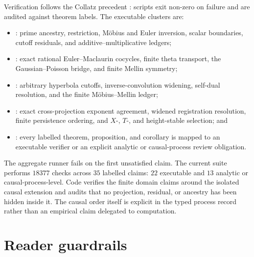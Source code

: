 \documentclass[11pt,a4paper]{article}
\theoremstyle{definition}
\begin{document}
Verification follows the Collatz precedent \parencite{petrik2026collatz}:
scripts exit non-zero on failure and are audited against theorem labels.
The executable clusters are:
\begin{itemize}
  \item {}: prime ancestry, restriction,
        Möbius and Euler inversion, scalar boundaries, cutoff residuals, and
        additive--multiplicative ledgers;
  \item {}: exact rational
        Euler--Maclaurin cocycles, finite theta transport, the
        Gaussian--Poisson bridge, and finite Mellin symmetry;
  \item {}: arbitrary hyperbola cutoffs,
        inverse-convolution widening, self-dual resolution, and the finite
        Möbius--Mellin ledger;
  \item {}: exact
        cross-projection exponent agreement, widened registration resolution,
        finite persistence ordering, and $X$-, $T$-, and height-stable
        selection; and
  \item {}: every labelled theorem,
        proposition, and corollary is mapped to an executable verifier or an
        explicit analytic or causal-process review obligation.
\end{itemize}
The aggregate runner  fails on the first
unsatisfied claim. The current suite performs $18377$ checks across $35$
labelled claims: $22$ executable and $13$ analytic or causal-process-level. Code
verifies the finite domain claims around the isolated causal extension and
audits that no projection, residual, or ancestry has been hidden inside it.
The causal order itself is explicit in the typed process record rather than an
empirical claim delegated to computation.

\section{Reader guardrails}
\label{sec:guardrails}
\end{document}
